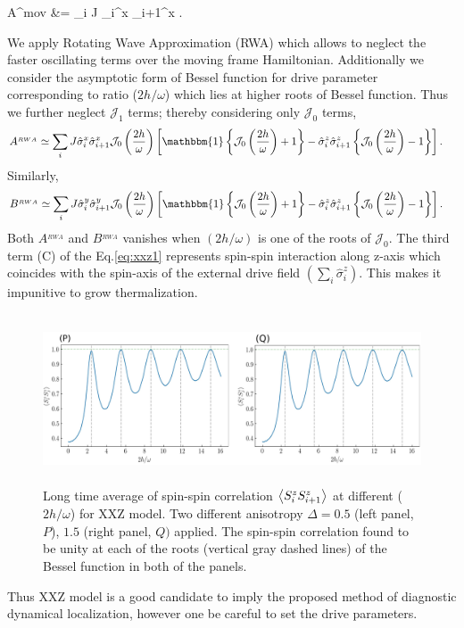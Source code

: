 \documentclass[aps,prb,reprint,showpacs,floatfix,superscriptaddress, onecolumn, nofootinbib, 9pt]{revtex4-2}
\begin{document}
\begin{enumerate}
{	\begin{algin}
		A^{mov} &= \sum_{i} J \hat{\sigma}_{i}^{x} \hat{\sigma}_{i+1}^{x}  .
	\end{algin}

	We apply Rotating Wave Approximation (RWA) which allows to neglect the faster oscillating terms over the moving frame Hamiltonian. Additionally we consider the asymptotic form of Bessel function for drive parameter corresponding to ratio ($2h/\omega$) which lies at higher roots of Bessel function. Thus we further neglect $\mathcal{J}_1$ terms; thereby considering only $\mathcal{J}_0$ terms,
	\begin{align}
	A^{_{RWA}} &\simeq \sum_{i} J \hat{\sigma}_{i}^{x} \hat{\sigma}_{i+1}^{x}\mathcal{J}_0\left(\frac{2h}{\omega}\right) \left[\mathbbm{1}\left\{\mathcal{J}_0\left(\frac{2h}{\omega}\right)+1\right\}-\hat{\sigma}^z_i\hat{\sigma}^z_{i+1}\left\{\mathcal{J}_0\left(\frac{2h}{\omega}\right)-1\right\}\right].
	\label{eq:xxz_a}
	\end{align}
	Similarly, 
	\begin{align}
		B^{_{RWA}} &\simeq \sum_{i} J \hat{\sigma}_{i}^{y} \hat{\sigma}_{i+1}^{y}\mathcal{J}_0\left(\frac{2h}{\omega}\right) \left[\mathbbm{1}\left\{\mathcal{J}_0\left(\frac{2h}{\omega}\right)+1\right\}-\hat{\sigma}^z_i\hat{\sigma}^z_{i+1}\left\{\mathcal{J}_0\left(\frac{2h}{\omega}\right)-1\right\}\right].
		\label{eq:xxz_b}
	\end{align}
	Both $A^{_{RWA}}$ and $B^{_{RWA}}$ vanishes when $(2h/\omega)$ is one of the roots of $\mathcal{J}_0$. The third term (C) of the Eq.\eqref{eq:xxz1} represents spin-spin interaction along z-axis which coincides with the spin-axis of the external drive field $(\sum_i\hat{\sigma}^z_i)$. This makes it impunitive to grow thermalization. 
	\begin{figure}[h!]
		\includegraphics[height=5cm]{xxz_d.png}
		\caption{Long time average of spin-spin correlation $\expval{S^z_i S^z_{i+1}}$ at different ($2h/\omega$) for XXZ model. Two different anisotropy $\Delta = 0.5$ (left panel,$P$), $1.5$ (right panel, $Q)$ applied. The spin-spin correlation found to be unity at each of the roots (vertical gray dashed lines) of the Bessel function in both of the panels.}
		\label{fig:std_Ns}
	\end{figure}

	Thus XXZ model is a good candidate to imply the proposed method of diagnostic dynamical localization, however one be careful to set the drive parameters.
	
	}
	\end{enumerate}
\end{document}
